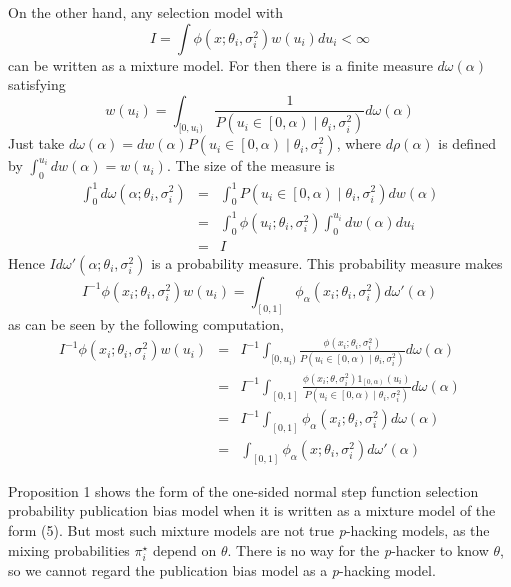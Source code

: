 On the other hand, any selection model with 
$$
I = \int \phi(x;\theta_{i},\sigma^2_{i})w(u_i)du_i<\infty
$$
can be written as a mixture model. For then there is a finite measure $d\omega(\alpha)$ satisfying 
\[
w(u_i)=\int_{[0,u_i)}\frac{1}{P(u_i\in\left[0,\alpha\right)\mid\theta_i,\sigma^2_{i})}d\omega(\alpha)
\]
Just take $d\omega(\alpha)=d w(\alpha)P(u_i\in\left[0,\alpha\right)\mid\theta_{i},\sigma^2_{i})$, where $d\rho(\alpha)$ is defined by $\int_{0}^{u_i}d w(\alpha)= w(u_i)$. The size of the measure is
\begin{eqnarray*}
\int_{0}^{1}d\omega(\alpha;\theta_{i},\sigma^2_{i}) & = & \int_{0}^{1}P(u_i\in\left[0,\alpha\right)\mid\theta_{i},\sigma^2_{i})d w(\alpha)\\
 & = & \int_{0}^{1}\phi(u_i;\theta_{i},\sigma^2_{i})\int_{0}^{u_i}d w(\alpha)du_i\\
 & = & I
\end{eqnarray*}
Hence $I d\omega'(\alpha;\theta_{i},\sigma^2_{i})$ is a probability measure. This probability measure makes 
\[
I^{-1}\phi(x_{i};\theta_{i},\sigma^2_{i})w(u_i)=\int_{[0,1]}\phi_\alpha(x_{i};\theta_{i},\sigma^2_{i})d\omega'(\alpha)
\]
as can be seen by the following computation,
\begin{eqnarray*}
I^{-1}\phi(x_{i};\theta_{i},\sigma^2_{i})w(u_i) & = & I^{-1}\int_{[0,u_i)}\frac{\phi(x_{i};\theta_{i},\sigma^2_{i})}{P(u_i\in\left[0,\alpha\right)\mid\theta_{i},\sigma^2_{i})}d\omega(\alpha)\\
 & = & I^{-1}\int_{[0,1]}\frac{\phi(x_{i};\theta,\sigma^2_{i})1_{\left[0,\alpha\right)}(u_i)}{P(u_i\in\left[0,\alpha\right)\mid\theta_{i},\sigma^2_{i})}d\omega(\alpha)\\
 & = & I^{-1}\int_{[0,1]}\phi_\alpha(x_{i};\theta_{i},\sigma^2_{i})d\omega(\alpha)\\
 & = & \int_{[0,1]}\phi_\alpha(x;\theta_{i},\sigma^2_{i})d\omega'(\alpha)
\end{eqnarray*}

Proposition 1 shows the form of the one-sided normal step function selection probability publication bias model when it is written as a mixture model of the form (5). But most such mixture models are not true \textit{p}-hacking models, as the mixing probabilities $\pi_{i}^{\star}$ depend on $\theta$. There is no way for the \textit{p}-hacker to know
$\theta$, so we cannot regard the publication bias model as a \textit{p}-hacking model.



